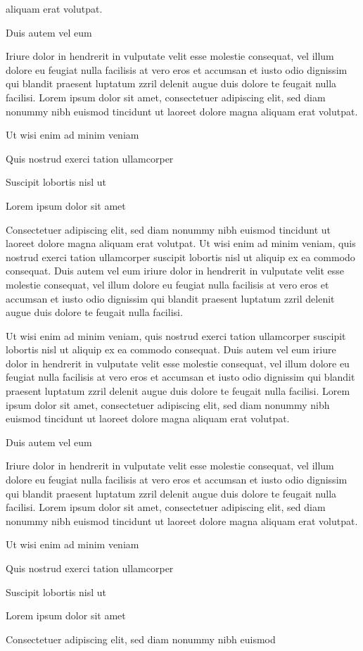 \documentclass[11pt,twoside]{article}\makeatletter
\begin{document}
      aliquam erat volutpat. \par Duis autem vel eum \par Iriure dolor in hendrerit in vulputate velit esse molestie
      consequat, vel illum dolore eu feugiat nulla facilisis at vero eros et
      accumsan et iusto odio dignissim qui blandit praesent luptatum zzril
      delenit augue duis dolore te feugait nulla facilisi. Lorem ipsum dolor
      sit amet, consectetuer adipiscing elit, sed diam nonummy nibh euismod
      tincidunt ut laoreet dolore magna aliquam erat volutpat. \par Ut wisi enim ad minim veniam\par Quis nostrud exerci tation ullamcorper \par Suscipit lobortis nisl ut \par Lorem ipsum dolor sit amet\par Consectetuer adipiscing elit, sed diam nonummy nibh euismod
      tincidunt ut laoreet dolore magna aliquam erat volutpat. Ut wisi enim
      ad minim veniam, quis nostrud exerci tation ullamcorper suscipit
      lobortis nisl ut aliquip ex ea commodo consequat. Duis autem vel eum
      iriure dolor in hendrerit in vulputate velit esse molestie consequat,
      vel illum dolore eu feugiat nulla facilisis at vero eros et accumsan
      et iusto odio dignissim qui blandit praesent luptatum zzril delenit
      augue duis dolore te feugait nulla facilisi.\par Ut wisi enim ad minim veniam, quis nostrud exerci tation
      ullamcorper suscipit lobortis nisl ut aliquip ex ea commodo
      consequat. Duis autem vel eum iriure dolor in hendrerit in vulputate
      velit esse molestie consequat, vel illum dolore eu feugiat nulla
      facilisis at vero eros et accumsan et iusto odio dignissim qui blandit
      praesent luptatum zzril delenit augue duis dolore te feugait nulla
      facilisi. Lorem ipsum dolor sit amet, consectetuer adipiscing elit,
      sed diam nonummy nibh euismod tincidunt ut laoreet dolore magna
      aliquam erat volutpat. \par Duis autem vel eum \par Iriure dolor in hendrerit in vulputate velit esse molestie
      consequat, vel illum dolore eu feugiat nulla facilisis at vero eros et
      accumsan et iusto odio dignissim qui blandit praesent luptatum zzril
      delenit augue duis dolore te feugait nulla facilisi. Lorem ipsum dolor
      sit amet, consectetuer adipiscing elit, sed diam nonummy nibh euismod
      tincidunt ut laoreet dolore magna aliquam erat volutpat. \par Ut wisi enim ad minim veniam\par Quis nostrud exerci tation ullamcorper \par Suscipit lobortis nisl ut \par Lorem ipsum dolor sit amet\par Consectetuer adipiscing elit, sed diam nonummy nibh euismod
\end{document}

